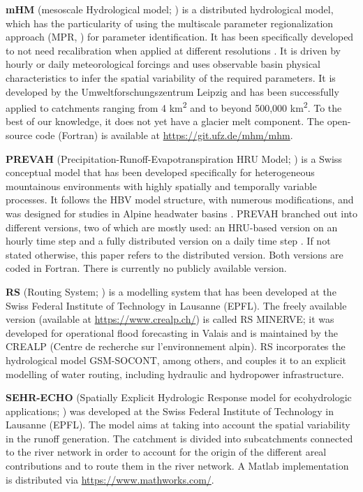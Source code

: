 \documentclass[10pt,a4paper]{article}
\begin{document}
\textbf{mHM} (mesoscale Hydrological model; \citealt{Samaniego2010a, Kumar2013, Thober2019}) is a distributed hydrological model, which has the particularity of using the multiscale parameter regionalization approach (MPR, \citealp{Samaniego2010a}) for parameter identification. It has been specifically developed to not need recalibration when applied at different resolutions \citep{Kauffeldt2016}. It is driven by hourly or daily meteorological forcings and uses observable basin physical characteristics to infer the spatial variability of the required parameters. It is developed by the Umweltforschungszentrum Leipzig and has been successfully applied to catchments ranging from 4 km\textsuperscript{2} and to beyond 500,000 km\textsuperscript{2}. To the best of our knowledge, it does not yet have a glacier melt component. The open-source code (Fortran) is available at \url{https://git.ufz.de/mhm/mhm}.

\textbf{PREVAH} (Precipitation-Runoff-Evapotranspiration HRU Model; \citealt{Gurtz1999, Viviroli2009a}) is a Swiss conceptual model that has been developed specifically for heterogeneous mountainous environments with highly spatially and temporally variable processes. It follows the HBV model structure, with numerous modifications, and was designed for studies in Alpine headwater basins \citep{Orth2015}. PREVAH branched out into different versions, two of which are mostly used: an HRU-based version on an hourly time step \citep{Viviroli2009a} and a fully distributed version on a daily time step \citep{Zappa2012, Speich2015}. If not stated otherwise, this paper refers to the distributed version. Both versions are coded in Fortran. There is currently no publicly available version.

\textbf{RS} (Routing System; \citealp{Dubois2000, GarciaHernandez2020, Foehn2020}) is a modelling system that has been developed at the Swiss Federal Institute of Technology in Lausanne (EPFL). The freely available version (available at \url{https://www.crealp.ch/}) is called RS MINERVE; it was developed for operational flood forecasting in Valais \citep{GarciaHernandez2009b, Hamdi2005} and is maintained by the CREALP (Centre de recherche sur l'environnement alpin). RS incorporates the hydrological model GSM-SOCONT, among others, and couples it to an explicit modelling of water routing, including hydraulic and hydropower infrastructure.

\textbf{SEHR-ECHO} (Spatially Explicit Hydrologic Response model for ecohydrologic applications; \citealp{Schaefli2014}) was developed at the Swiss Federal Institute of Technology in Lausanne (EPFL). The model aims at taking into account the spatial variability in the runoff generation. The catchment is divided into subcatchments connected to the river network in order to account for the origin of the different areal contributions and to route them in the river network. A Matlab implementation is distributed via \url{https://www.mathworks.com/}.
\end{document}
